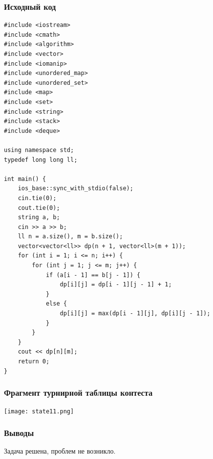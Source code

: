 \subsubsection*{Исходный код}
\begin{lstlisting}
#include <iostream>
#include <cmath>
#include <algorithm>
#include <vector>
#include <iomanip>
#include <unordered_map>
#include <unordered_set>
#include <map>
#include <set>
#include <string>
#include <stack>
#include <deque>

using namespace std;
typedef long long ll;

int main() {
    ios_base::sync_with_stdio(false);
    cin.tie(0);
    cout.tie(0);
    string a, b;
    cin >> a >> b;
    ll n = a.size(), m = b.size();
    vector<vector<ll>> dp(n + 1, vector<ll>(m + 1));
    for (int i = 1; i <= n; i++) {
        for (int j = 1; j <= m; j++) {
            if (a[i - 1] == b[j - 1]) {
                dp[i][j] = dp[i - 1][j - 1] + 1;
            }
            else {
                dp[i][j] = max(dp[i - 1][j], dp[i][j - 1]);
            }
        }
    }
    cout << dp[n][m];
    return 0;
}
\end{lstlisting}
\subsubsection*{Фрагмент турнирной таблицы контеста}
\begin{center}
\texttt{[image: state11.png]}\newline\noindent
\end{center}

\subsubsection*{Выводы}
Задача решена, проблем не возникло.

